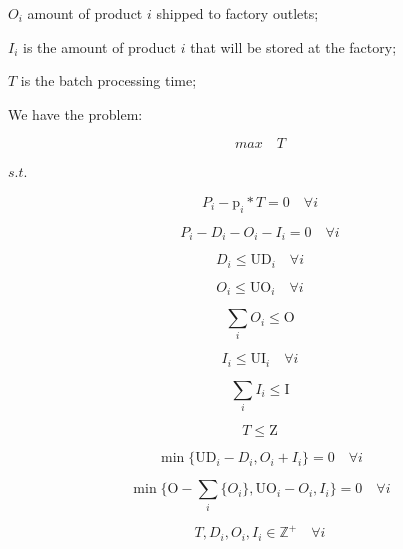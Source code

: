\documentclass[10pt,fleqn,a4paper,twoside]{article}
\begin{document}
$O_i$ amount of product $i$ shipped to factory outlets;

$I_i$ is the amount of product $i$ that will be stored at the factory;

$T$ is the batch processing time;

We have the problem:

\begin{equation}
\label{MBPTMP01}
max \quad T
\end{equation}

$s.t.$

\begin{equation}
P_i - \textrm{p}_i * T  = 0 \quad \forall i
\end{equation}

\begin{equation}
P_i - D_i - O_i - I_i = 0 \quad \forall i
\end{equation}

\begin{equation}
\label{MBPTMP04}
D_i \leq \textrm{UD}_i \quad \forall i
\end{equation}

\begin{equation}
O_i \leq \textrm{UO}_i \quad \forall i
\end{equation}

\begin{equation}
\sum_i{O_i} \leq \textrm{O}
\end{equation}

\begin{equation}
I_i \leq \textrm{UI}_i \quad \forall i
\end{equation}

\begin{equation}
\sum_i{I_i} \leq \textrm{I}
\end{equation}

\begin{equation}
T \leq \textrm{Z}
\end{equation}

\begin{equation}
\min \{\textrm{UD}_i - D_i, O_i + I_i\} = 0 \quad \forall i
\end{equation}

\begin{equation}
\min\{\textrm{O} - \sum_i\{ O_i\}, \textrm{UO}_i - O_i, I_i\} = 0 \quad \forall i
\end{equation}

\begin{equation}
\label{MBPTMP10}
T, D_i, O_i, I_i \in  \mathbb{Z}^ + \quad \forall i
\end{equation}
\end{document}
